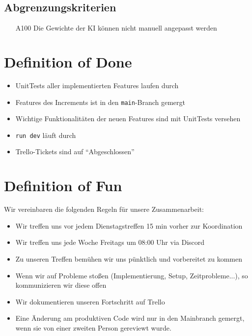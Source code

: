 \documentclass[titlepage]{scrartcl}
\begin{document}
\subsection{Abgrenzungskriterien}
	\begin{itemize}
		\item[A100] Die Gewichte der KI können nicht manuell angepasst werden
	\end{itemize}
	
\section{Definition of Done}%
\begin{itemize}
	\item UnitTests aller implementierten Features laufen durch
	\item Features des Increments ist in den \texttt{main}-Branch gemergt
	\item Wichtige Funktionalitäten der neuen Features sind mit UnitTests versehen
	\item \texttt{run dev} läuft durch
	\item Trello-Tickets sind auf "`Abgeschlossen"'
\end{itemize}

\section{Definition of Fun}%
Wir vereinbaren die folgenden Regeln für unsere Zusammenarbeit:
\begin{itemize}
	\item Wir treffen uns vor jedem Dienstagstreffen 15 min vorher zur Koordination
	\item Wir treffen uns jede Woche Freitags um 08:00 Uhr via Discord
	\item Zu unseren Treffen bemühen wir uns pünktlich und vorbereitet zu kommen
	\item Wenn wir auf Probleme stoßen (Implementierung, Setup, Zeitprobleme...), so kommunizieren wir diese offen
	\item Wir dokumentieren unseren Fortschritt auf Trello
	\item Eine Änderung am produktiven Code wird nur in den Mainbranch gemergt, wenn sie von einer zweiten Person gereviewt wurde.
\end{itemize}

\end{document}
